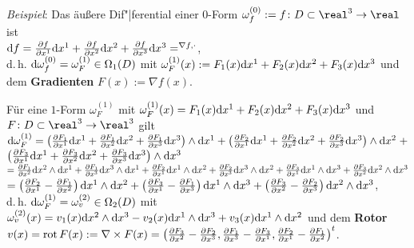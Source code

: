 \linie
\pagebreak

\emph{Beispiel}:
Das äußere Dif"|ferential einer $0$-Form
$\omega_f^{(0)} := f\colon D \subset \real^3 \rightarrow \real$ ist \\
$\mathrm{d} f = \frac{\partial f}{\partial x^1} \mathrm{d} x^1 +
\frac{\partial f}{\partial x^2} \mathrm{d} x^2 +
\frac{\partial f}{\partial x^3} \mathrm{d} x^3 = \sp{\nabla f, \cdot}$, \\
d.\,h. $\mathrm{d} \omega_f^{(0)} = \omega_F^{(1)} \in \Omega_1(D)$ mit
$\omega_F^{(1)}(x) := F_1(x) \mathrm{d} x^1 + F_2(x) \mathrm{d} x^2 + F_3(x) \mathrm{d} x^3$ und
dem \textbf{Gradienten} $F(x) := \nabla f(x)$.

Für eine $1$-Form $\omega_F^{(1)}$ mit
$\omega_F^{(1)}(x) = F_1(x) \mathrm{d} x^1 + F_2(x) \mathrm{d} x^2 + F_3(x) \mathrm{d} x^3$ und
$F\colon D \subset \real^3 \rightarrow \real^3$ gilt
$\mathrm{d} \omega_F^{(1)} = \left(\frac{\partial F_1}{\partial x^1} \mathrm{d} x^1 +
\frac{\partial F_1}{\partial x^2} \mathrm{d} x^2 +
\frac{\partial F_1}{\partial x^3} \mathrm{d} x^3\right) \land \mathrm{d} x^1 +
\left(\frac{\partial F_2}{\partial x^1} \mathrm{d} x^1 +
\frac{\partial F_2}{\partial x^2} \mathrm{d} x^2 +
\frac{\partial F_2}{\partial x^3} \mathrm{d} x^3\right) \land \mathrm{d} x^2 \;+$ \\
$\left(\frac{\partial F_3}{\partial x^1} \mathrm{d} x^1 +
\frac{\partial F_3}{\partial x^2} \mathrm{d} x^2 +
\frac{\partial F_3}{\partial x^3} \mathrm{d} x^3\right) \land \mathrm{d} x^3$ \\
$= \frac{\partial F_1}{\partial x^2} \mathrm{d} x^2 \land \mathrm{d} x^1 +
\frac{\partial F_1}{\partial x^3} \mathrm{d} x^3 \land \mathrm{d} x^1 +
\frac{\partial F_2}{\partial x^1} \mathrm{d} x^1 \land \mathrm{d} x^2 +
\frac{\partial F_2}{\partial x^3} \mathrm{d} x^3 \land \mathrm{d} x^2 +
\frac{\partial F_3}{\partial x^1} \mathrm{d} x^1 \land \mathrm{d} x^3 +
\frac{\partial F_3}{\partial x^2} \mathrm{d} x^2 \land \mathrm{d} x^3$ \\
$= \left(\frac{\partial F_2}{\partial x^1} -
\frac{\partial F_1}{\partial x^2}\right) \mathrm{d} x^1 \land \mathrm{d} x^2 +
\left(\frac{\partial F_3}{\partial x^1} -
\frac{\partial F_1}{\partial x^3}\right) \mathrm{d} x^1 \land \mathrm{d} x^3 +
\left(\frac{\partial F_3}{\partial x^2} -
\frac{\partial F_2}{\partial x^3}\right) \mathrm{d} x^2 \land \mathrm{d} x^3$, \\
d.\,h. $\mathrm{d} \omega_F^{(1)} = \omega_v^{(2)} \in \Omega_2(D)$ mit
$\omega_v^{(2)}(x) = v_1(x) \mathrm{d} x^2 \land \mathrm{d} x^3 - v_2(x) \mathrm{d} x^1 \land
\mathrm{d} x^3 + v_3(x) \mathrm{d} x^1 \land \mathrm{d} x^2$ und
dem \textbf{Rotor} $v(x) = \operatorname{rot} F(x) := \nabla \times F(x) =
\left(\frac{\partial F_3}{\partial x^2} - \frac{\partial F_2}{\partial x^3},
\frac{\partial F_1}{\partial x^3} - \frac{\partial F_3}{\partial x^1},
\frac{\partial F_2}{\partial x^1} -
\frac{\partial F_1}{\partial x^2}\right)^t$.

